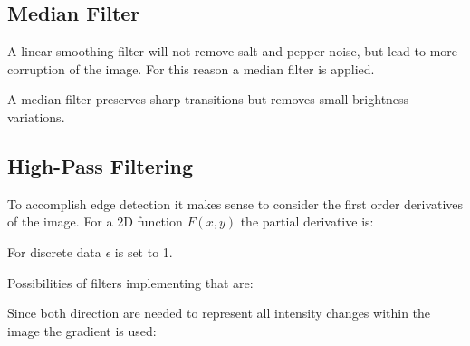 \documentclass[10pt,a4paper]{scrartcl}
\begin{document}
\begin{multicols*}{2}
\subsection{Median Filter}

A linear smoothing filter will not remove salt and pepper noise, but lead to more corruption of the image. For this reason a median filter is applied.


A median filter preserves sharp transitions but removes small brightness variations.

\subsection{High-Pass Filtering}

To accomplish edge detection it makes sense to consider the first order derivatives of the image. For a 2D function $F(x,y)$ the partial derivative is:


For discrete data $\epsilon$ is set to 1.


Possibilities of filters implementing that are:



Since both direction are needed to represent all intensity changes within the image the gradient is used:


\end{multicols*}
\end{document}

